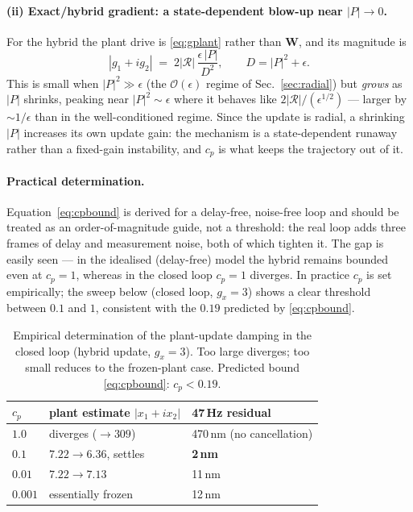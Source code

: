\documentclass[11pt]{article}
\newcommand{\SI}[2]{#1\,#2}
\newcommand{\vW}{\mathbf{W}}
\begin{document}
\paragraph{(ii) Exact/hybrid gradient: a state-dependent blow-up near $|P|\to0$.}
For the hybrid the plant drive is \eqref{eq:gplant} rather than $\vW$, and
its magnitude is
\begin{equation}
  |g_1+ig_2| \;=\; 2|\mathcal{R}|\,\frac{\epsilon\,|P|}{D^{2}},
  \qquad D=|P|^{2}+\epsilon .
\end{equation}
This is small when $|P|^{2}\!\gg\!\epsilon$ (the $\mathcal{O}(\epsilon)$
regime of Sec.~\ref{sec:radial}) but \emph{grows} as $|P|$ shrinks, peaking
near $|P|^2\!\sim\!\epsilon$ where it behaves like $2|\mathcal{R}|/(\epsilon^{1/2})$
--- larger by $\sim\!1/\epsilon$ than in the well-conditioned regime. Since
the update is radial, a shrinking $|P|$ increases its own update gain: the
mechanism is a state-dependent runaway rather than a fixed-gain
instability, and $c_{\!p}$ is what keeps the trajectory out of it.

\paragraph{Practical determination.}
Equation~\eqref{eq:cpbound} is derived for a delay-free, noise-free loop
and should be treated as an order-of-magnitude guide, not a threshold: the
real loop adds three frames of delay and measurement noise, both of which
tighten it. The gap is easily seen --- in the idealised (delay-free) model
the hybrid remains bounded even at $c_{\!p}=1$, whereas in the closed loop
$c_{\!p}=1$ diverges. In practice $c_{\!p}$ is set empirically; the sweep
below (closed loop, $g_x=3$) shows a clear threshold between $0.1$ and $1$,
consistent with the $0.19$ predicted by \eqref{eq:cpbound}.

\begin{table}[h]
  \centering
  \begin{tabular}{lll}
    \toprule
    $c_{\!p}$ & plant estimate $|x_1{+}ix_2|$ & \SI{47}{Hz} residual\\
    \midrule
    $1.0$    & diverges ($\to\!309$)              & \SI{470}{nm} (no cancellation)\\
    $0.1$    & $7.22\!\to\!6.36$, settles         & \textbf{\SI{2}{nm}}\\
    $0.01$   & $7.22\!\to\!7.13$                  & \SI{11}{nm}\\
    $0.001$  & essentially frozen                 & \SI{12}{nm}\\
    \bottomrule
  \end{tabular}
  \caption{Empirical determination of the plant-update damping in the
  closed loop (hybrid update, $g_x=3$). Too large diverges; too small
  reduces to the frozen-plant case. Predicted bound
  \eqref{eq:cpbound}: $c_{\!p}<0.19$.}
  \label{tab:cp}
\end{table}
\end{document}
